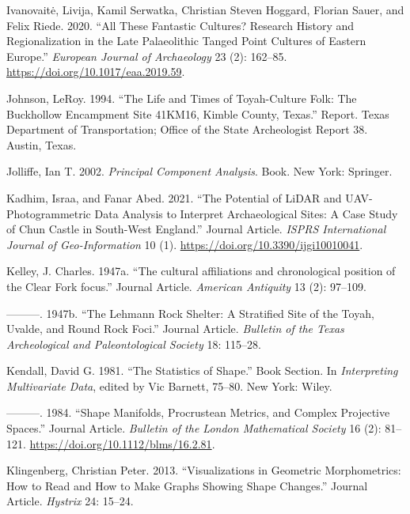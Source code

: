 \documentclass[smallextended]{svjour3}       %
\newlength{\cslhangindent}
\newlength{\cslentryspacingunit} %
\newenvironment{CSLReferences}[2] %
 {%
  \setlength{\parindent}{0pt}
  \ifodd #1
  \let\oldpar\par
  \def\par{\hangindent=\cslhangindent\oldpar}
  \fi
  \setlength{\parskip}{#2\cslentryspacingunit}
 }%
 {}
\begin{document}
\begin{CSLReferences}{1}{0}
\leavevmode{}%
Ivanovaitė, Livija, Kamil Serwatka, Christian Steven Hoggard, Florian
Sauer, and Felix Riede. 2020. {``All These Fantastic Cultures? Research
History and Regionalization in the Late Palaeolithic Tanged Point
Cultures of Eastern Europe.''} \emph{European Journal of Archaeology} 23
(2): 162--85. \url{https://doi.org/10.1017/eaa.2019.59}.

\leavevmode{}%
Johnson, LeRoy. 1994. {``{The Life and Times of Toyah-Culture Folk: The
Buckhollow Encampment Site 41KM16, Kimble County, Texas}.''} Report.
Texas Department of Transportation; Office of the State Archeologist
Report 38. Austin, Texas.

\leavevmode{}%
Jolliffe, Ian T. 2002. \emph{Principal Component Analysis}. Book. New
York: Springer.

\leavevmode{}%
Kadhim, Israa, and Fanar Abed. 2021. {``{The Potential of LiDAR and
UAV-Photogrammetric Data Analysis to Interpret Archaeological Sites: A
Case Study of Chun Castle in South-West England}.''} Journal Article.
\emph{ISPRS International Journal of Geo-Information} 10 (1).
\url{https://doi.org/10.3390/ijgi10010041}.

\leavevmode{}%
Kelley, J. Charles. 1947a. {``{The cultural affiliations and
chronological position of the Clear Fork focus}.''} Journal Article.
\emph{American Antiquity} 13 (2): 97--109.

\leavevmode{}%
---------. 1947b. {``{The Lehmann Rock Shelter: A Stratified Site of the
Toyah, Uvalde, and Round Rock Foci}.''} Journal Article. \emph{Bulletin
of the Texas Archeological and Paleontological Society} 18: 115--28.

\leavevmode{}%
Kendall, David G. 1981. {``{The Statistics of Shape}.''} Book Section.
In \emph{Interpreting Multivariate Data}, edited by Vic Barnett, 75--80.
New York: Wiley.

\leavevmode{}%
---------. 1984. {``Shape Manifolds, Procrustean Metrics, and Complex
Projective Spaces.''} Journal Article. \emph{Bulletin of the London
Mathematical Society} 16 (2): 81--121.
\url{https://doi.org/10.1112/blms/16.2.81}.

\leavevmode{}%
Klingenberg, Christian Peter. 2013. {``{Visualizations in Geometric
Morphometrics: How to Read and How to Make Graphs Showing Shape
Changes}.''} Journal Article. \emph{Hystrix} 24: 15--24.


\end{CSLReferences}
\end{document}
